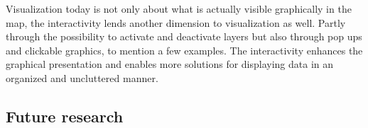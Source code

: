 \documentclass[a4paper,12pt,titlepage]{article}
\begin{document}












Visualization today is not only about what is actually visible graphically in the map, the interactivity lends another dimension to visualization as well. Partly through the possibility to activate and deactivate layers but also through pop ups and clickable graphics, to mention a few examples. The interactivity enhances the graphical presentation and enables more solutions for displaying data in an organized and uncluttered manner.

\subsection{Future research}



\newpage

\noindent

\end{document}

